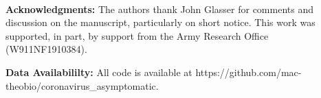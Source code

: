 \mbox{}\\
\noindent
\textbf{Acknowledgments:} The authors thank John Glasser for comments
and discussion on the manuscript, particularly on short notice. 
This work was supported, in part,
by support from the Army Research Office (W911NF1910384).

\noindent
\textbf{Data Availabililty:} All code is available at https://github.com/mac-theobio/coronavirus_asymptomatic.
